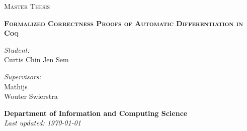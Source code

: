 \begin{titlepage}

    \begin{figure}
       \begin{minipage}{0.48\textwidth}
       \begin{flushleft}
       \end{flushleft}
       \end{minipage}\hfill
       \begin{minipage}{0.48\textwidth}
       \begin{flushright}
       \end{flushright}
       \end{minipage}
    \end{figure}

    \thispagestyle{fancy}

    \vspace{1in}

    \center

    \textsc{\large Master Thesis}

    \vspace{0.5in}

    \noindent\makebox[\linewidth]{\rule{\linewidth}{1.2pt}}
    \textsc{\textbf{\large Formalized Correctness Proofs of Automatic Differentiation in Coq}}
    \noindent\makebox[\linewidth]{\rule{\linewidth}{1.2pt}}

    \vspace{0.5in}

    \begin{minipage}{0.48\textwidth}
        \begin{flushleft}
            \textit{Student:} \\
            Curtis Chin Jen Sem \\
        \end{flushleft}
    \end{minipage}
    \begin{minipage}{0.48\textwidth}
        \begin{flushright}
        \textit{Supervisors:} \\
        Mathijs \Vakar \\
        Wouter Swierstra \\
        \end{flushright}
    \end{minipage}

    \vspace{2in}

    \textbf{\large Department of Information and Computing Science} \\
    \textit{Last updated: \today}
\end{titlepage}
